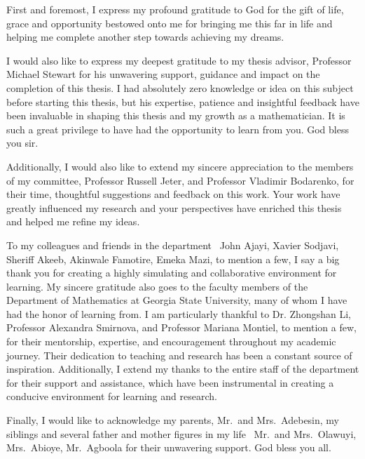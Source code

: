 First and foremost, I express my profound gratitude to God for the gift of life, grace and opportunity bestowed onto me for bringing me this far in life and helping me complete another step towards achieving my dreams.

I would also like to express my deepest gratitude to my thesis advisor, Professor Michael Stewart for his unwavering support, guidance and impact on the completion of this thesis. I had absolutely zero knowledge or idea on this subject before starting this thesis, but his expertise, patience and insightful feedback have been invaluable in shaping this thesis and my growth as a mathematician. It is such a great privilege to have had the opportunity to learn from you. God bless you sir.

Additionally, I would also like to extend my sincere appreciation to the members of my committee, Professor Russell Jeter, and Professor Vladimir Bodarenko, for their time, thoughtful suggestions and feedback on this work. Your work have greatly influenced my research and your perspectives have enriched this thesis and helped me refine my ideas.

To my colleagues and friends in the department \textemdash\, John Ajayi, Xavier Sodjavi, Sheriff Akeeb, Akinwale Famotire, Emeka Mazi, to mention a few, I say a big thank you for creating a highly simulating and collaborative environment for learning. My sincere gratitude also goes to the faculty members of the Department of Mathematics at Georgia State University, many of whom I have had the honor of learning from. I am particularly thankful to Dr. Zhongshan Li, Professor Alexandra Smirnova, and Professor Mariana Montiel, to mention a few, for their mentorship, expertise, and encouragement throughout my academic journey. Their dedication to teaching and research has been a constant source of inspiration. Additionally, I extend my thanks to the entire staff of the department for their support and assistance, which have been instrumental in creating a conducive environment for learning and research.

Finally, I would like to acknowledge my parents, Mr.\ and Mrs.\ Adebesin, my siblings and several father and mother figures in my life \textemdash\, Mr.\ and Mrs.\ Olawuyi, Mrs.\ Abioye, Mr.\ Agboola for their unwavering support. God bless you all.


